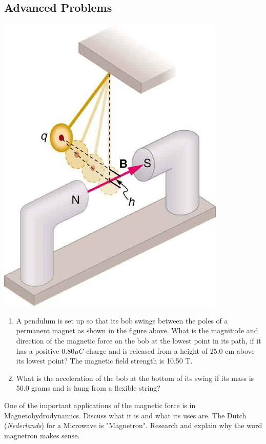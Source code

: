 \documentclass[9pt,addpoints]{exam}
\begin{document}
\begin{questions}
		\subsection*{Advanced Problems}
		\question \begin{center}
			\includegraphics[scale=0.4]{pen}
		\end{center}
		\begin{enumerate}[label=(\alph*)]
			\item A pendulum is set up so that its bob swings between the poles of a permanent magnet as shown in the figure above. What is the magnitude and direction of the magnetic force on the bob at the lowest point in its path, if it has a positive $0.80\mu C$ charge and is released from a height of 25.0 cm above its lowest point? The magnetic field strength is 10.50 T.
			\item What is the acceleration of the bob at the bottom of its swing if its mass is 50.0 grams and is hung from a flexible string?
		\end{enumerate}
		\question One of the important applications of the magnetic force is in Magnetohydrodynamics. Discuss what it is and what its uses are.
		\question The Dutch (\textit{Nederlands}) for a Microwave is "Magnetron". Research and explain why the word magnetron makes sense.
	\end{questions}		
\end{document}
